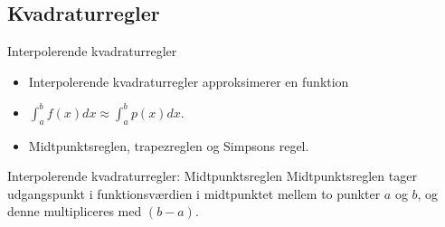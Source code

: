\subsection{Kvadraturregler}
\begin{frame}{Interpolerende kvadraturregler}

\begin{itemize}
    \item Interpolerende kvadraturregler approksimerer en funktion %
    \item $ \int_{a}^{b} f(x) dx \approx \int_{a}^{b} p(x) dx. $
    \item Midtpunktsreglen, trapezreglen og Simpsons regel. 
    \end{itemize}
\end{frame}


\begin{frame}{Interpolerende kvadraturregler: Midtpunktsreglen}
    Midtpunktsreglen tager udgangspunkt i funktionsværdien i midtpunktet mellem to punkter $a$ og $b$, og denne multipliceres med $(b-a)$.
    
\end{frame}


